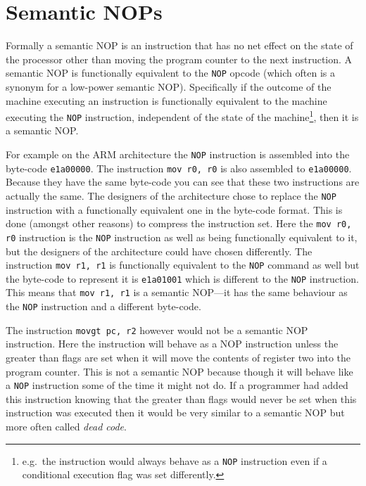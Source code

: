 \documentclass[10pt,]{book}
\begin{document}
\section{Semantic NOPs}

Formally a semantic NOP is an instruction that has no net effect on the
state of the processor other than moving the program counter to the next
instruction. A semantic NOP is functionally equivalent to the
\lstinline!NOP! opcode (which often is a synonym for a low-power
semantic NOP). Specifically if the outcome of the machine executing an
instruction is functionally equivalent to the machine executing the
\lstinline!NOP! instruction, independent of the state of the
machine\footnote{e.g.~the instruction would always behave as a
  \lstinline!NOP! instruction even if a conditional execution flag was
  set differently.}, then it is a semantic NOP.

For example on the ARM architecture\autocite{Seal:2000vd} the
\lstinline!NOP! instruction is assembled into the byte-code
\lstinline!e1a00000!. The instruction \lstinline!mov r0, r0! is also
assembled to \lstinline!e1a00000!. Because they have the same byte-code
you can see that these two instructions are actually the same. The
designers of the architecture chose to replace the \lstinline!NOP!
instruction with a functionally equivalent one in the byte-code format.
This is done (amongst other reasons) to compress the instruction set.
Here the \lstinline!mov r0, r0! instruction is the \lstinline!NOP!
instruction as well as being functionally equivalent to it, but the
designers of the architecture could have chosen differently. The
instruction \lstinline!mov r1, r1! is functionally equivalent to the
\lstinline!NOP! command as well but the byte-code to represent it is
\lstinline!e1a01001! which is different to the \lstinline!NOP!
instruction. This means that \lstinline!mov r1, r1! is a semantic
NOP---it has the same behaviour as the \lstinline!NOP! instruction and a
different byte-code.

The instruction \lstinline!movgt pc, r2! however would not be a semantic
NOP instruction. Here the instruction will behave as a NOP instruction
unless the greater than flags are set when it will move the contents of
register two into the program counter. This is not a semantic NOP
because though it will behave like a \lstinline!NOP! instruction some of
the time it might not do. If a programmer had added this instruction
knowing that the greater than flags would never be set when this
instruction was executed then it would be very similar to a semantic NOP
but more often called \emph{dead code}\autocite{Collberg:1997vt}.
\end{document}
